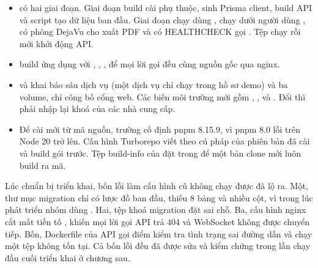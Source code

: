 \begin{itemize}
\item {} có hai giai đoạn. Giai đoạn build cài phụ thuộc, sinh Prisma client, build API và script tạo dữ liệu ban đầu. Giai đoạn chạy dùng , chạy dưới người dùng , có phông DejaVu cho xuất PDF và có HEALTHCHECK gọi . Tệp  chạy  rồi mới khởi động API.
\item {} build ứng dụng với , , , để mọi lời gọi đều cùng nguồn gốc qua nginx.
\item {} và  khai báo sáu dịch vụ (một dịch vụ chỉ chạy trong hồ sơ demo) và ba volume, chỉ công bố cổng web. Các biến môi trường mới gồm , ,  và . Đổi  thì phải nhập lại khoá của các nhà cung cấp.
\item Để cài mới từ mã nguồn, trường  cố định pnpm 8.15.9, vì pnpm 8.0 lỗi trên Node 20 trở lên. Cấu hình Turborepo viết theo cú pháp của phiên bản đã cài và build gói  trước. Tệp build-info của  đặt trong  để một bản clone mới luôn build ra mã.
\end{itemize}

Lúc chuẩn bị triển khai, bốn lỗi làm cấu hình cũ không chạy được đã lộ ra. Một, thư mục migration chỉ có lược đồ ban đầu, thiếu 8 bảng và nhiều cột, vì trong lúc phát triển nhóm dùng . Hai, tệp khoá migration đặt sai chỗ. Ba, cấu hình nginx cắt mất tiền tố , khiến mọi lời gọi API trả 404 và WebSocket không được chuyển tiếp. Bốn, Dockerfile của API gọi điểm kiểm tra tình trạng sai đường dẫn và chạy một tệp không tồn tại. Cả bốn lỗi đều đã được sửa và kiểm chứng trong lần chạy đầu cuối triển khai ở chương sau.
